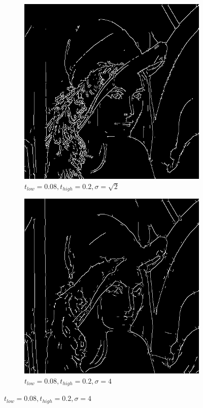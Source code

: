 \documentclass[a4paper]{article}
\begin{document}
\begin{figure}[h]
    
        \centering
        \begin{subfigure}[b]{0.3\textwidth}
                \centering
                \includegraphics[width=\textwidth]{q2-lena-canny-0200814.png}
                \caption{$t_{low}=0.08, t_{high}=0.2, \sigma=\sqrt{2}$}
                \label{fig:3a}
        \end{subfigure}
        \begin{subfigure}[b]{0.3\textwidth}
                \centering
                \includegraphics[width=\textwidth]{q2-lena-canny-020084.png}
                \caption{$t_{low}=0.08, t_{high}=0.2, \sigma=4$}
                \label{fig:3b}
                

\end{subfigure}
\end{figure}
\end{document}
